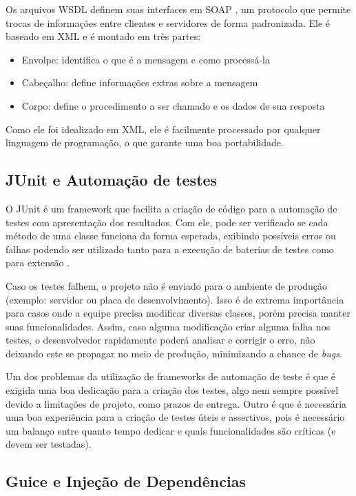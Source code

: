       Os arquivos WSDL definem suas interfaces em SOAP \cite{w3c-spec-soa}, um protocolo que permite trocas de informações entre clientes e servidores de forma padronizada. Ele é baseado em \ac{XML} e é montado em três partes:
      \begin{itemize}
        \item Envolpe: identifica o que é a mensagem e como processá-la
        \item Cabeçalho: define informações extras sobre a mensagem
        \item Corpo: define o procedimento a ser chamado e os dados de sua resposta
      \end{itemize}

      Como ele foi idealizado em \ac{XML}, ele é facilmente processado por qualquer linguagem de programação, o que garante uma boa portabilidade.

    \subsection{JUnit e Automação de testes}

      O JUnit é um framework que facilita a criação de código para a automação de testes com apresentação dos resultados. Com ele, pode ser verificado se cada método de uma classe funciona da forma esperada, exibindo possíveis erros ou falhas podendo ser utilizado tanto para a execução de baterias de testes como para extensão \cite{wikipedia-junit}.

      Caso os testes falhem, o projeto não é enviado para o ambiente de produção (exemplo: servidor ou placa de desenvolvimento). Isso é de extrema importância para casos onde a equipe precisa modificar diversas classes, porém precisa manter suas funcionalidades. Assim, caso alguma modificação criar alguma falha nos testes, o desenvolvedor rapidamente poderá analisar e corrigir o erro, não deixando este se propagar no meio de produção, minimizando a chance de \textit{bugs}.

      Um dos problemas da utilização de frameworks de automação de teste é que é exigida uma boa dedicação para a criação dos testes, algo nem sempre possível devido a limitações de projeto, como prazos de entrega. Outro é que é necessária uma boa experiência para a criação de testes úteis e assertivos, pois é necessário um balanço entre quanto tempo dedicar e quais funcionalidades são críticas (e devem ser testadas).

    \subsection{Guice e Injeção de Dependências}

